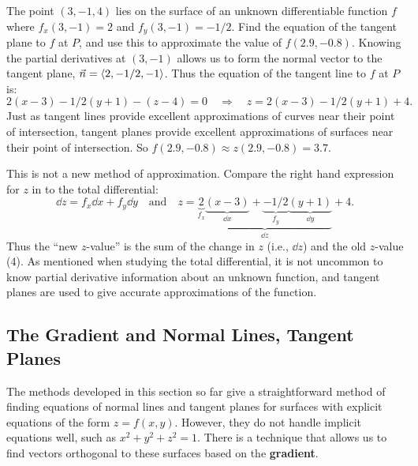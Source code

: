 \begin{example}\label{ex_tpl7}%
The point $(3,-1,4)$ lies on the surface of an unknown differentiable function $f$ where $f_x(3,-1) = 2$ and $f_y(3,-1) = -1/2$. Find the equation of the tangent plane to $f$ at $P$, and use this to approximate the value of $f(2.9,-0.8)$.
\solution
Knowing the partial derivatives at $(3,-1)$ allows us to form the normal vector to the tangent plane, $\vec n =\left\langle 2,-1/2,-1\right\rangle$. Thus the equation of the tangent line to $f$ at $P$ is:
\begin{equation}
2(x-3)-1/2(y+1) - (z-4) = 0
\quad \Rightarrow \quad
z = 2(x-3)-1/2(y+1)+4.\label{eq:tpl7}%
\end{equation}
Just as tangent lines provide excellent approximations of curves near their point of intersection, tangent planes provide excellent approximations of surfaces near their point of intersection. So $f(2.9,-0.8) \approx z(2.9,-0.8) = 3.7.$

This is not a new method of approximation. Compare the right hand expression for $z$ in  to the total differential:
\[
\dd z = f_x\dd x + f_y\dd y \quad \text{and} \quad z =
\underbrace{\underbrace{2}_{f_x}\underbrace{(x-3)}_{\dd x}
+\underbrace{-1/2}_{f_y}\underbrace{(y+1)}_{\dd y}}_{\dd z}+4.
\]
Thus the ``new $z$-value'' is the sum of the change in $z$ (i.e., $\dd z$) and the old $z$-value (4). As mentioned when studying the total differential, it is not uncommon to know partial derivative information about an unknown function, and tangent planes are used to give accurate approximations of the function.
\end{example}

\subsection{The Gradient and Normal Lines, Tangent Planes}

The methods developed in this section so far give a straightforward method of finding equations of normal lines and tangent planes for surfaces with explicit equations of the form $z=f(x,y)$. However, they do not handle implicit equations well, such as $x^2+y^2+z^2=1$. There is a technique that allows us to find vectors orthogonal to these surfaces based on the \textbf{gradient}.


